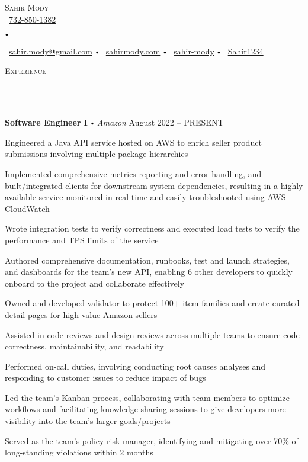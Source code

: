 \documentclass{article}
\newcommand{\contact}[3]{
\vspace*{3pt}
\begin{center}
{\Huge \scshape {#1}}\\
\vspace{0pt}
#2 
\vspace{0pt}
#3
\end{center}
\vspace*{-3pt}
}
\newcommand{\header}[1]{{
\hspace*{-15pt}\vspace*{10pt} \large \scshape{#1}} \vspace*{-6pt} 
\lineunder
}
\newcommand{\lineunder}{
\vspace*{-8pt} \\ \hspace*{-18pt} 
\hrulefill \\
}
\newcommand{\employer}[4]{
\textbf{#1} \labelitemi \textit{#2} \hfill #3 \\ #4 \vspace*{3pt}
}
\renewcommand{\labelitemi}{
$\vcenter{\hbox{\tiny$\bullet$}}$\hspace*{3pt}
}
\renewcommand{\labelitemii}{
$\vcenter{\hbox{\tiny$\bullet$}}$\hspace*{-3pt}
}
\newenvironment{bullet-list-minor}{
\begin{list}{\labelitemii}{\setlength\leftmargin{15pt} 
\topsep 0pt \itemsep 1pt}}{\vspace*{4pt}\end{list}
}
\begin{document}
\small
\vspace*{-64pt}

\contact{Sahir Mody}\bigskip
{\faPhone\
\href{tel:7328501382}{732-850-1382}
\labelitemi
\faEnvelope\  \href{mailto:sahir.modyatgmail.com}{sahir.mody@gmail.com} \labelitemi \faInfoCircle\  \href{https://sahirmody.com}{sahirmody.com} \labelitemi \faLinkedinSquare\  \href{https://www.linkedin.com/in/sahir-mody}{sahir-mody}  \labelitemi \faGithub\  \href{https://www.github.com/Sahir1234}{Sahir1234}}

\medskip

\header{Experience}
    \vspace{4pt}
    \employer{Software Engineer I}{Amazon}{August 2022 -- PRESENT}{}
	\begin{bullet-list-minor}
        \item Engineered a Java API service hosted on AWS to enrich seller product submissions involving multiple package hierarchies
        \item Implemented comprehensive metrics reporting and error handling, and built/integrated clients for downstream system dependencies, resulting in a highly available service monitored in real-time and easily troubleshooted using AWS CloudWatch
        \item Wrote integration tests to verify correctness and executed load tests to verify the performance and TPS limits of the service
        \item Authored comprehensive documentation, runbooks, test and launch strategies, and dashboards for the team's new API, enabling 6 other developers to quickly onboard to the project and collaborate effectively
        \item Owned and developed validator to protect 100+ item families and create curated detail pages for high-value Amazon sellers
        \item Assisted in code reviews and design reviews across multiple teams to ensure code correctness, maintainability, and readability
        \item Performed on-call duties, involving conducting root causes analyses and responding to customer issues to reduce impact of bugs
        \item Led the team's Kanban process, collaborating with team members to optimize workflows and facilitating knowledge sharing sessions to give developers more visibility into the team's larger goals/projects
        \item Served as the team's policy risk manager, identifying and mitigating over 70\% of long-standing violations within 2 months
    \end{bullet-list-minor}
    \medskip
    
\end{document}

